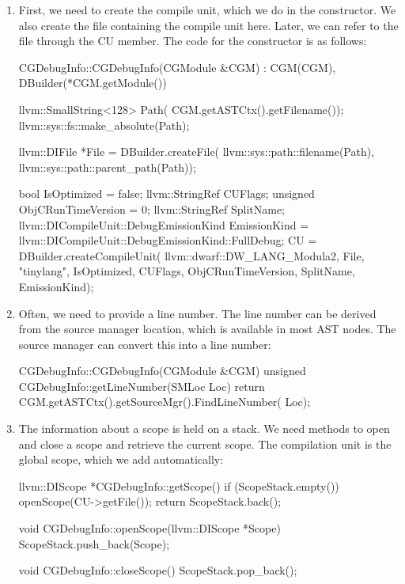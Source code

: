 \begin{enumerate}
\item
First, we need to create the compile unit, which we do in the constructor. We also create the file containing the compile unit here. Later, we can refer to the file through the CU member.
The code for the constructor is as follows:

\begin{cpp}
CGDebugInfo::CGDebugInfo(CGModule &CGM)
        : CGM(CGM), DBuilder(*CGM.getModule()) {
    llvm::SmallString<128> Path(
        CGM.getASTCtx().getFilename());
    llvm::sys::fs::make_absolute(Path);

    llvm::DIFile *File = DBuilder.createFile(
        llvm::sys::path::filename(Path),
        llvm::sys::path::parent_path(Path));

    bool IsOptimized = false;
    llvm::StringRef CUFlags;
    unsigned ObjCRunTimeVersion = 0;
    llvm::StringRef SplitName;
    llvm::DICompileUnit::DebugEmissionKind EmissionKind =
        llvm::DICompileUnit::DebugEmissionKind::FullDebug;
    CU = DBuilder.createCompileUnit(
        llvm::dwarf::DW_LANG_Modula2, File, "tinylang",
        IsOptimized, CUFlags, ObjCRunTimeVersion,
        SplitName, EmissionKind);
}
\end{cpp}

\item
Often, we need to provide a line number. The line number can be derived from the source manager location, which is available in most AST nodes. The source manager can convert this into a line number:

\begin{cpp}
    CGDebugInfo::CGDebugInfo(CGModule &CGM)
unsigned CGDebugInfo::getLineNumber(SMLoc Loc) {
    return CGM.getASTCtx().getSourceMgr().FindLineNumber(
        Loc);
}
\end{cpp}

\item
The information about a scope is held on a stack. We need methods to open and close a scope and retrieve the current scope. The compilation unit is the global scope, which we add automatically:

\begin{cpp}
llvm::DIScope *CGDebugInfo::getScope() {
    if (ScopeStack.empty())
    openScope(CU->getFile());
    return ScopeStack.back();
}

void CGDebugInfo::openScope(llvm::DIScope *Scope) {
    ScopeStack.push_back(Scope);
}

void CGDebugInfo::closeScope() {
    ScopeStack.pop_back();
}
\end{cpp}


\end{enumerate}
